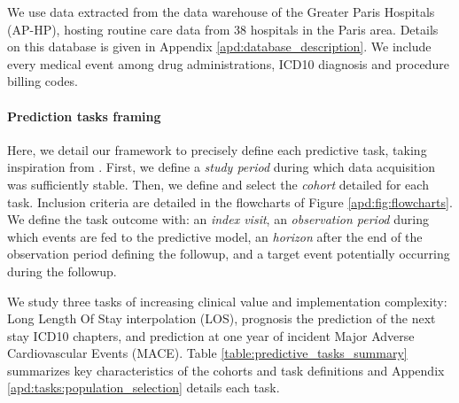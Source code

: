 \documentclass[french,12pt,twoside,a4paper]{book}
\begin{document}
We use data extracted from the data warehouse of the Greater Paris Hospitals
(AP-HP), hosting routine care data from 38 hospitals in the Paris area. Details
on this database is given in Appendix \ref{apd:database_description}. We include
every medical event among drug administrations, ICD10 diagnosis and procedure
billing codes.

\paragraph{Prediction tasks framing} Here, we detail our framework to precisely
define each predictive task, taking inspiration from
\cite{ohdsi2019book,tomavsev2021use}. First, we define a \emph{study period}
during which data acquisition was sufficiently stable. Then, we define and
select the \emph{cohort} detailed for each task. Inclusion criteria are detailed
in the flowcharts of Figure \ref{apd:fig:flowcharts}. We define the task outcome
with: an \emph{index visit}, an \emph{observation period} during which events
are fed to the predictive model, an \emph{horizon} after the end of the
observation period defining the followup, and a target event potentially
occurring during the followup.

We study three tasks of increasing clinical value and implementation complexity:
Long Length Of Stay interpolation (LOS), prognosis the prediction of the next
stay ICD10 chapters, and prediction at one year of incident Major Adverse
Cardiovascular Events (MACE). Table \ref{table:predictive_tasks_summary}
summarizes key characteristics of the cohorts and task definitions and Appendix
\ref{apd:tasks:population_selection} details each task.
\end{document}
